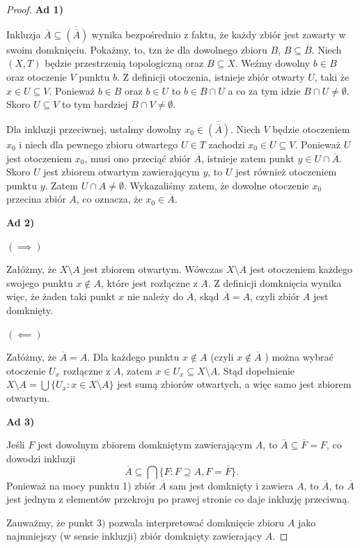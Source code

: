 \begin{proof}
	\noindent \textbf{Ad 1)}

	Inkluzja $\overline{A} \subseteq \overline{\left( \overline{A} \right) }$ wynika bezpośrednio z faktu, że każdy zbiór jest zawarty w swoim domknięciu. Pokażmy, to, tzn że dla dowolnego zbioru $B$, $B \subseteq \overline{B}$. Niech $\left( X,T \right) $ będzie przestrzenią topologiczną oraz $B \subseteq X$. Weźmy dowolny $b \in B$ oraz otoczenie $V$ punktu $b$. Z definicji otoczenia, istnieje zbiór otwarty  $U$, taki że $x \in U \subseteq V$. Ponieważ $b \in B$ oraz $b \in U$ to $b \in B\cap U$ a co za tym idzie $B\cap U \neq \emptyset$. Skoro $U\subseteq V$ to tym bardziej $B\cap V \neq \emptyset$.

	Dla inkluzji przeciwnej, ustalmy dowolny $x_0 \in \overline{\left( \overline{A} \right) }$. Niech $V$ będzie otoczeniem  $x_0$ i niech dla pewnego zbioru otwartego $U \in T$ zachodzi $x_0 \in U \subseteq V$. Ponieważ $U$ jest otoczeniem $x_0$, musi ono przeciąć zbiór $\overline{A}$, istnieje zatem punkt $y \in U\cap \overline{A}$. Skoro $U $ jest zbiorem otwartym zawierającym $y$, to $U$ jest również otoczeniem punktu $y$. Zatem $U\cap A \neq \emptyset$. Wykazaliśmy zatem, że dowolne otoczenie $x_0$ przecina zbiór $A$, co oznacza, że $x_0 \in \overline{A}$.

\noindent \textbf{Ad 2)} 

$\bm{ \left( \implies \right)  } $ 

Załóżmy, że $X\setminus A$ jest zbiorem otwartym. Wówczas $X\setminus A$ jest otoczeniem każdego swojego punktu $x \not\in A$, które jest rozłączne z $A$. Z definicji domknięcia wynika więc, że żaden taki punkt $x$ nie należy do $\overline{A}$, skąd $\overline{A} = A$, czyli zbiór $A$ jest domknięty.

$\bm{ \left( \impliedby \right)  } $ 

Załóżmy, że $\overline{A} = A$. Dla każdego punktu $x\not\in A$ (czyli $x \not\in \overline{A}$ ) można wybrać otoczenie $U_{x}$ rozłączne z $A$, zatem $x \in U_{x}\subseteq X\setminus A$. Stąd dopełnienie $X\setminus A = \bigcup \{U_{x}: x\in X\setminus A\}  $ jest sumą zbiorów otwartych, a więc samo jest zbiorem otwartym.

\noindent \textbf{Ad 3)}

Jeśli $F$ jest dowolnym zbiorem domkniętym zawierającym $A$, to $\overline{A}\subseteq \overline{F} = F$, co dowodzi inkluzji 
 \[
\overline{A} \subseteq \bigcap \{F : F \supseteq A, F = \overline{F}\}  
.\] 
Ponieważ na mocy punktu 1) zbiór $\overline{A}$ sam jest domknięty i zawiera $A$, to $\overline{A}$, to $\overline{A}$ jest jednym z elementów przekroju po prawej stronie co daje inkluzję przeciwną.

Zauważmy, że punkt $3)$ pozwala interpretować domknięcie zbioru $A$ jako najmniejszy (w sensie inkluzji) zbiór domknięty zawierający $A$.
\end{proof} 
